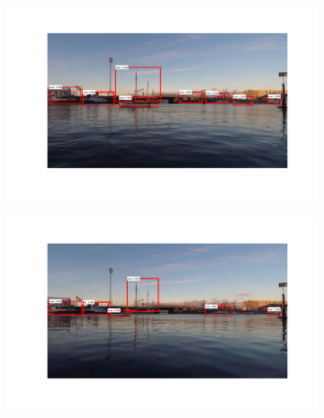 \begin{figure}
	\begin{subfigure}[t]{.5\textwidth}
	\centering
	\includegraphics[width=\linewidth]{fig/discussion/ex3_1.png}
	\end{subfigure}%
	\begin{subfigure}[t]{.5\textwidth}
	\centering
	\includegraphics[width=\linewidth]{fig/discussion/ex4_1.png}
	\end{subfigure}


\end{figure}

